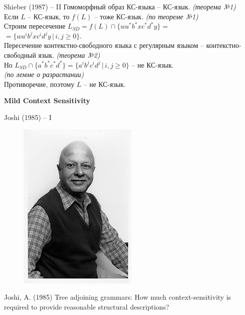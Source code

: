 \documentclass{beamer}
\begin{document}
\begin{frame}{Shieber (1987) -- II}
Гомоморфный образ КС-языка -- КС-язык. {\small \textit{(теорема №1)}}\\
\bigskip
Если $L$ -- КС-язык, то $f(L)$ -- тоже КС-язык. {\small \textit{(по теореме №1)}}\\
\bigskip
Строим пересечение $L_{SD} = f(L) \cap \{ wa^*b^*xc^*d^*y \} =$\\ $= \{ wa^ib^jxc^id^jy \, | \, i, j \geq 0 \}$.\\
\bigskip
Пересечение контекстно-свободного языка с регулярным языком -- контекстно-свободный язык. {\small \textit{(теорема №2)}}\\
\bigskip
Но $L_{SD} \cap \{ a^*b^*c^*d^* \} = \{ a^ib^jc^id^j \, | \, i, j \geq 0 \}$ -- не КС-язык.\\ {\small \textit{(по лемме о разрастании)}}\\
\bigskip
Противоречие, поэтому $L$ -- не КС-язык.
\end{frame}


\begin{frame}{}
\begin{center}
	\textbf{Mild Context Sensitivity}
\end{center}
\end{frame}

\begin{frame}{Joshi (1985) -- I}
\begin{center}
	\begin{figure}[H]
		\includegraphics[scale=0.5]{joshi.jpg} 
	\end{figure}
\end{center}
\smallskip
\begin{center}
{\small Joshi, A. (1985) Tree adjoining grammars: How much context-sensitivity is required to provide reasonable structural descriptions?}
\end{center}
\end{frame}
\end{document}
